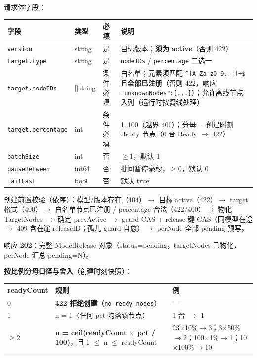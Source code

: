 请求体字段：

\begin{tabularx}{\textwidth}{l l l X}
  \toprule
  \textbf{字段} & \textbf{类型} & \textbf{必填} & \textbf{说明} \\
  \midrule
  \texttt{version} & string & 是 & 目标版本；\textbf{须为 active}（否则 422） \\
  \texttt{target.type} & string & 是 & \texttt{nodeIDs} / \texttt{percentage} 二选一 \\
  \texttt{target.nodeIDs} & []string & 条件必填 & 白名单；元素须匹配 \verb|^[A-Za-z0-9._-]+$| 且\textbf{全部已注册}（否则 422，响应 \texttt{"unknownNodes":[...]}）；允许离线节点入列（运行时按离线处理） \\
  \texttt{target.percentage} & int & 条件必填 & 1..100（越界 400）；分母 = 创建时刻 Ready 节点（0 台 Ready $\rightarrow$ 422） \\
  \texttt{batchSize} & int & 否 & $\geq$1，默认 1 \\
  \texttt{pauseBetween} & int64 & 否 & 批间暂停毫秒，$\geq$0，默认 0 \\
  \texttt{failFast} & bool & 否 & 默认 true \\
  \bottomrule
\end{tabularx}

创建前置校验（依序）：模型/版本存在（404）$\rightarrow$ 目标 active（422）$\rightarrow$ target 格式（400）$\rightarrow$ 白名单节点已注册 / percentage 合法（422/400）$\rightarrow$ 物化 TargetNodes $\rightarrow$ 确定 prevActive $\rightarrow$ guard CAS + release 键 CAS（同模型在途 $\rightarrow$ 409 含在途 releaseID；孤儿 guard 自愈）$\rightarrow$ perNode 全部 pending 预写。

响应 \textbf{202}：完整 ModelRelease 对象（status=pending，targetNodes 已物化，perNode 汇总 pending=N）。

\textbf{按比例分母口径与舍入}（创建时刻快照）：

\begin{tabularx}{\textwidth}{l l X}
  \toprule
  \textbf{readyCount} & \textbf{规则} & \textbf{例} \\
  \midrule
  0 & \textbf{422 拒绝创建}（\texttt{no ready nodes}） & — \\
  1 & n = 1（任何 pct 均落该节点） & 1 台 $\rightarrow$ 1 \\
  $\geq$2 & \textbf{n = ceil(readyCount $\times$ pct / 100)}，且 1 $\leq$ n $\leq$ readyCount & 23$\times$10\%$\rightarrow$3；3$\times$50\%$\rightarrow$2；100$\times$1\%$\rightarrow$1；10$\times$100\%$\rightarrow$10 \\
  \bottomrule
\end{tabularx}

